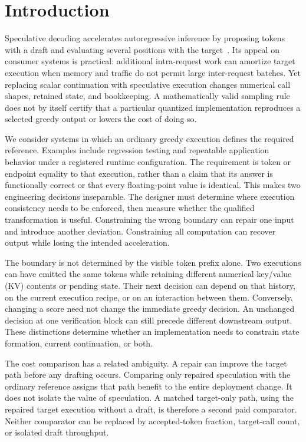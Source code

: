 \section{Introduction}
\label{sec:introduction}
Speculative decoding accelerates autoregressive inference by proposing tokens with a draft and evaluating several positions with the target~\cite{leviathan2023}. Its appeal on consumer systems is practical: additional intra-request work can amortize target execution when memory and traffic do not permit large inter-request batches. Yet replacing scalar continuation with speculative execution changes numerical call shapes, retained state, and bookkeeping. A mathematically valid sampling rule does not by itself certify that a particular quantized implementation reproduces a selected greedy output or lowers the cost of doing so.

We consider systems in which an ordinary greedy execution defines the required reference. Examples include regression testing and repeatable application behavior under a registered runtime configuration. The requirement is token or endpoint equality to that execution, rather than a claim that its answer is functionally correct or that every floating-point value is identical. This makes two engineering decisions inseparable. The designer must determine where execution consistency needs to be enforced, then measure whether the qualified transformation is useful. Constraining the wrong boundary can repair one input and introduce another deviation. Constraining all computation can recover output while losing the intended acceleration.

The boundary is not determined by the visible token prefix alone. Two executions can have emitted the same tokens while retaining different numerical key/value (KV) contents or pending state. Their next decision can depend on that history, on the current execution recipe, or on an interaction between them. Conversely, changing a score need not change the immediate greedy decision. An unchanged decision at one verification block can still precede different downstream output. These distinctions determine whether an implementation needs to constrain state formation, current continuation, or both.

The cost comparison has a related ambiguity. A repair can improve the target path before any drafting occurs. Comparing only repaired speculation with the ordinary reference assigns that path benefit to the entire deployment change. It does not isolate the value of speculation. A matched target-only path, using the repaired target execution without a draft, is therefore a second paid comparator. Neither comparator can be replaced by accepted-token fraction, target-call count, or isolated draft throughput.


